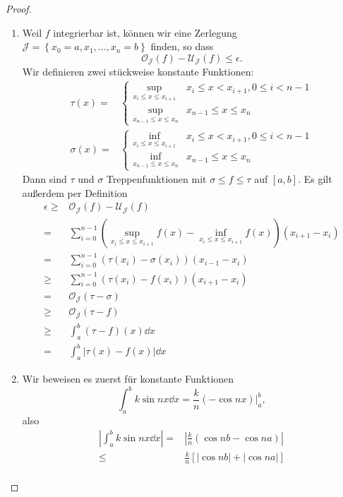 \begin{proof}
	\begin{enumerate}[label=(\roman*)]
		\item Weil $f$ integrierbar ist, können wir eine Zerlegung $\mathcal{J}=\left\{ x_0=a,x_1,\dots, x_n=b \right\} $ finden, so dass
			\[
				\mathcal{O}_{\mathcal{J}}(f)-\mathcal{U}_{\mathcal{J}}(f)\le \epsilon
			.\] 
			Wir definieren zwei stückweise konstante Funktionen:
			\begin{align*}
				\tau(x)=&\begin{cases}\sup_{x_i \le x \le x_{i+1}} & x_i \le x < x_{i+1}, 0\le i <n-1\\
					\sup_{x_{n-1}\le x \le x_n} & x_{n-1} \le x \le x_n
				\end{cases}\\
				\sigma(x)=&\begin{cases}\inf_{x_i \le x \le x_{i+1}} & x_i \le x < x_{i+1}, 0\le i <n-1\\
					\inf_{x_{n-1}\le x \le x_n} & x_{n-1} \le x \le x_n
					\end{cases}
			\end{align*}
			Dann sind $\tau$ und $\sigma$ Treppenfunktionen mit $\sigma \le f \le \tau$ auf $[a,b]$. Es gilt außerdem per Definition
			\begin{align*}
				\epsilon\ge&\mathcal{O}_{\mathcal{J}}(f)-\mathcal{U}_{\mathcal{J}}(f)\\
				=&\sum_{i=0}^{n-1}\left( \sup_{x_i\le x\le x_{i+1}}f(x)-\inf_{x_i\le x\le x_{i+1}}f(x) \right)(x_{i+1}-x_i) \\
					=&\sum_{i=0}^{n-1}(\tau(x_i)-\sigma(x_i))(x_{i-1}-x_i)\\
					\ge&\sum_{i=0}^{n-1}\left( \tau(x_i)-f(x_i) \right)\left( x_{i+1}-x_i \right) \\
					=&\mathcal{O}_{\mathcal{J}}(\tau-\sigma)\\
					\ge& \mathcal{O}_{\mathcal{J}}(\tau - f)\\
					\ge& \int_a^b (\tau - f)(x)\dd{x}\\
					=&\int_a^b |\tau(x)-f(x)|\dd{x}
			\end{align*}
		\item Wir beweisen es zuerst für konstante Funktionen
			\[
				\int_a^b k\sin nx\dd{x}=\frac{k}{n}(-\cos nx)|_a^b
			,\]
			also
			\begin{align*}
				\left| \int_a^b k\sin nx\dd{x} \right| =& \left| \frac{k}{n}\left( \cos nb-\cos na \right)  \right|\\
				\le& \frac{k}{n}\left[|\cos nb|+|\cos na| \right]\\

\end{align*}
\end{enumerate}
\end{proof}
